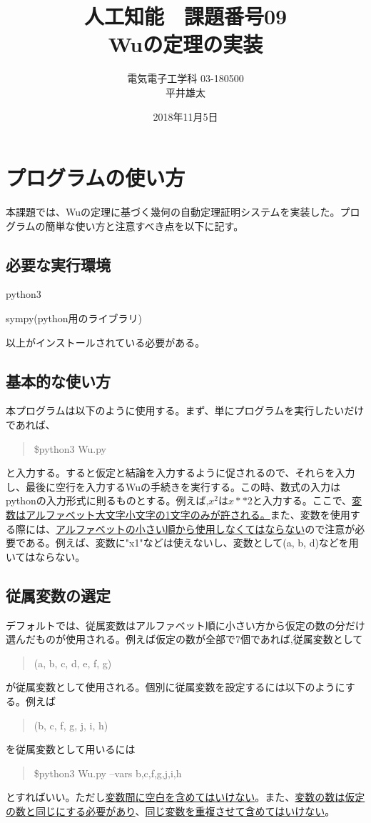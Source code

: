 \documentclass[dvipdfmx]{jsarticle}
\begin{document}
\title{人工知能　課題番号09  \\Wuの定理の実装}
\author{電気電子工学科 03-180500\\ 平井雄太}
\date{2018年11月5日}
\maketitle

\section{プログラムの使い方}
本課題では、Wuの定理に基づく幾何の自動定理証明システムを実装した。プログラムの簡単な使い方と注意すべき点を以下に記す。

\subsection{必要な実行環境}
python3

sympy(python用のライブラリ)

以上がインストールされている必要がある。

\subsection{基本的な使い方}
本プログラムは以下のように使用する。まず、単にプログラムを実行したいだけであれば、
\begin{quote}
\$python3 Wu.py 
\end{quote}
と入力する。すると仮定と結論を入力するように促されるので、それらを入力し、最後に空行を入力するWuの手続きを実行する。この時、数式の入力はpythonの入力形式に則るものとする。例えば,$x^2$は$x**2$と入力する。ここで、\underline{変数はアルファベット大文字小文字の1文字のみが許される。}また、変数を使用する際には、\underline{アルファベットの小さい順から使用しなくてはならない}ので注意が必要である。例えば、変数に"x1"などは使えないし、変数として(a, b, d)などを用いてはならない。
\subsection{従属変数の選定}
デフォルトでは、従属変数はアルファベット順に小さい方から仮定の数の分だけ選んだものが使用される。例えば仮定の数が全部で7個であれば,従属変数として
\begin{quote}
(a, b, c, d, e, f, g)
\end{quote}
が従属変数として使用される。個別に従属変数を設定するには以下のようにする。例えば
\begin{quote}
(b, c, f, g, j, i, h)
\end{quote}
を従属変数として用いるには
\begin{quote}
\$python3 Wu.py --vars b,c,f,g,j,i,h
\end{quote}
とすればいい。ただし\underline{変数間に空白を含めてはいけない}。また、\underline{変数の数は仮定の数と同じにする必要があり}、\underline{同じ変数を重複させて含めてはいけない}。
\end{document}
